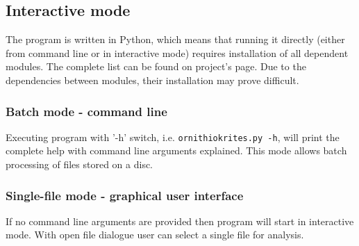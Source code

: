 \documentclass[paper=a4, fontsize=11pt]{scrartcl}	%
\numberwithin{equation}{section}		%
\numberwithin{figure}{section}			%
\numberwithin{table}{section}				%
\begin{document}
\subsection{Interactive mode}
\label{sec:interactive_mode}
The program is written in Python, which means that running it directly (either from command line or in interactive mode) requires installation of all dependent modules. The complete list can be found on project's page. Due to the dependencies between modules, their installation may prove difficult.
\subsubsection{Batch mode - command line}
Executing program with '-h' switch, i.e. \texttt{ornithiokrites.py -h}, will print the complete help with command line arguments explained. This mode allows batch processing of files stored on a disc.
\subsubsection{Single-file mode - graphical user interface}
If no command line arguments are provided then program will start in interactive mode. With open file dialogue user can select a single file for analysis.
\end{document}
